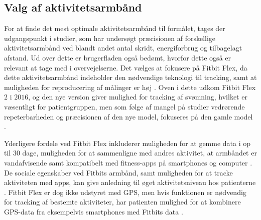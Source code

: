 \subsection{Valg af aktivitetsarmbånd}

For at finde det mest optimale aktivitetsarmbånd til formålet, tages der udgangspunkt i studier, som har undersøgt præcisionen af forskellige aktivitetsarmbånd ved blandt andet antal skridt, energiforbrug og tilbagelagt afstand. Ud over dette er brugerfladen også bedømt, hvorfor dette også er relevant at tage med i overvejelserne. Det vælges at fokusere på Fitbit Flex, da dette aktivitetsarmbånd indeholder den nødvendige teknologi til tracking, samt at muligheden for reproducering af målinger er høj \citep{kaewkannate2016}. Oven i dette udkom Fitbit Flex $2$ i $2016$, og den nye version giver mulighed for tracking af svømning, hvilket er væsentligt for patientgruppen, men som følge af mangel på studier vedrørende repeterbarheden og præcisionen af den nye model, fokuseres på den gamle model \citep{fitbitflex}.

Yderligere fordele ved Fitbit Flex inkluderer muligheden for at gemme data i op til $30$ dage, muligheden for at sammenligne med andres aktivitet, at armbåndet er vandafvisende samt kompatibelt med fitness-apps på smartphones og computer \citep{kaewkannate2016, fitbitflex}. De sociale egenskaber ved Fitbits armbånd, samt muligheden for at tracke aktiviteten med apps, kan give anledning til øget aktivitetsniveau hos patienterne \citep{karapanos2016, rooksby2014}. Fitbit Flex er dog ikke udstyret med GPS, men hvis funktionen er nødvendig for tracking af bestemte aktiviteter, har patienten mulighed for at kombinere GPS-data fra eksempelvis smartphones med Fitbits data \citep{fitbitflex}.
